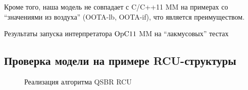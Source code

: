 Кроме того, наша модель не совпадает с C/C++11 MM на примерах со ``значениями из воздуха''
(\textrm{OOTA-lb}, \textrm{OOTA-if}), что является преимуществом.


\begin{table}
\centering
{%
 \small
 
}
\caption{Результаты запуска интерпретатора $\mathrm{OpC11}$ MM на ``лакмусовых'' тестах}
\label{fig:litmusTbl}
\end{table}


\subsection{Проверка модели на примере RCU-структуры}
\label{sec:opc11:rcu}

\begin{figure*}

\caption[Реализация алгоритма QSBR RCU]
{Реализация алгоритма QSBR RCU}
\label{fig:rcuProg} \end{figure*}

